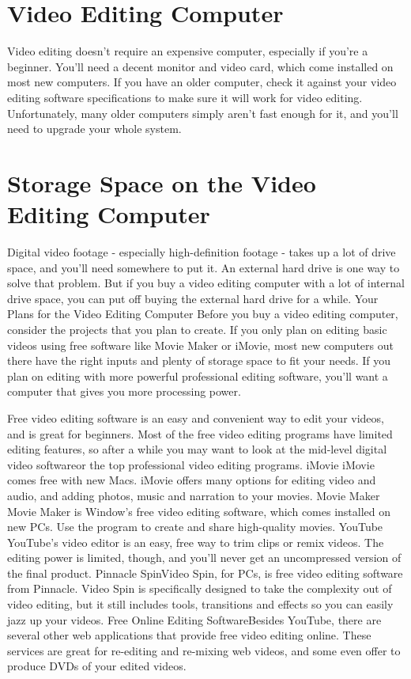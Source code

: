
\section{Video Editing Computer}
Video editing doesn't require an expensive computer, especially if you're a beginner. You'll need a decent monitor and video card, which come installed on most new computers. If you have an older computer, check it against your video editing software specifications to make sure it will work for video editing.
Unfortunately, many older computers simply aren't fast enough for it, and you'll need to upgrade your whole system.

\section{Storage Space on the Video Editing Computer}
Digital video footage - especially high-definition footage - takes up a lot of drive space, and you'll need somewhere to put it.
An external hard drive is one way to solve that problem. But if you buy a video editing computer with a lot of internal drive space, you can put off buying the external hard drive for a while.
Your Plans for the Video Editing Computer
Before you buy a video editing computer, consider the projects that you plan to create.
If you only plan on editing basic videos using free software like Movie Maker or iMovie, most new computers out there have the right inputs and plenty of storage space to fit your needs.
If you plan on editing with more powerful professional editing software, you’ll want a computer that gives you more processing power.

Free video editing software is an easy and convenient way to edit your videos, and is great for beginners. Most of the free video editing programs have limited editing features, so after a while you may want to look at the mid-level digital video softwareor the top professional video editing programs.
iMovie
iMovie comes free with new Macs. iMovie offers many options for editing video and audio, and adding photos, music and narration to your movies. 
Movie Maker
Movie Maker is Window's free video editing software, which comes installed on new PCs. Use the program to create and share high-quality movies. 
YouTube
YouTube's video editor is an easy, free way to trim clips or remix videos. The editing power is limited, though, and you'll never get an uncompressed version of the final product. 
Pinnacle SpinVideo Spin, for PCs, is free video editing software from Pinnacle. Video Spin is specifically designed to take the complexity out of video editing, but it still includes tools, transitions and effects so you can easily jazz up your videos.
Free Online Editing SoftwareBesides YouTube, there are several other web applications that provide free video editing online. These services are great for re-editing and re-mixing web videos, and some even offer to produce DVDs of your edited videos.



